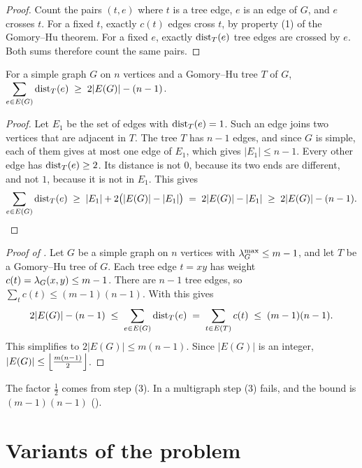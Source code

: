\begin{proof}

Count the pairs $(t,e)$ where $t$ is a tree edge, $e$ is an edge of $G$, and $e$ crosses $t$. For a fixed $t$, exactly $c(t)$ edges cross $t$, by property (1) of the Gomory--Hu theorem. For a fixed $e$, exactly $\operatorname{dist}_T(e)$ tree edges are crossed by $e$. Both sums therefore count the same pairs.

\end{proof}

\begin{lemma}\label{lem:sum-dist}\label{lem:dist-1-count}
For a simple graph $G$ on $n$ vertices and a Gomory--Hu tree $T$ of $G$, $\displaystyle\sum_{e \in E(G)} \operatorname{dist}_T(e) \;\ge\; 2|E(G)| - (n-1)$.
\end{lemma}

\begin{proof}
Let $E_1$ be the set of edges with $\operatorname{dist}_T(e) = 1$.
Such an edge joins two vertices that are adjacent in $T$.
The tree $T$ has $n-1$ edges, and since $G$ is simple, each of them gives at most one edge of $E_1$, which gives $|E_1| \le n-1$.
Every other edge has $\operatorname{dist}_T(e) \ge 2$. Its distance is not $0$, because its two ends are different, and not $1$, because it is not in $E_1$. This gives
\[
\sum_{e \in E(G)} \operatorname{dist}_T(e) \;\ge\; |E_1| + 2\bigl(|E(G)| - |E_1|\bigr) \;=\; 2|E(G)| - |E_1| \;\ge\; 2|E(G)| - (n-1). \qedhere
\]
\end{proof}

\begin{proof}[Proof of ]
Let $G$ be a simple graph on $n$ vertices with $\lambda^{\max}_G \le m-1$, and let $T$ be a Gomory--Hu tree of $G$.
Each tree edge $t = xy$ has weight $c(t) = \lambda_G(x, y) \le m-1$.
There are $n-1$ tree edges, so $\sum_{t} c(t) \le (m-1)(n-1)$.
With  this gives
\[
2|E(G)| - (n-1) \;\le\; \sum_{e \in E(G)} \operatorname{dist}_T(e) \;=\; \sum_{t \in E(T)} c(t) \;\le\; (m-1)(n-1).
\]
This simplifies to $2|E(G)| \le m(n-1)$. Since $|E(G)|$ is an integer, $|E(G)| \le \left\lfloor \frac{m(n-1)}{2} \right\rfloor$.
\end{proof}

The factor $\tfrac12$ comes from step (3). In a multigraph step (3) fails, and the bound is $(m-1)(n-1)$ ().


\section{Variants of the problem}\label{sec:variants}

